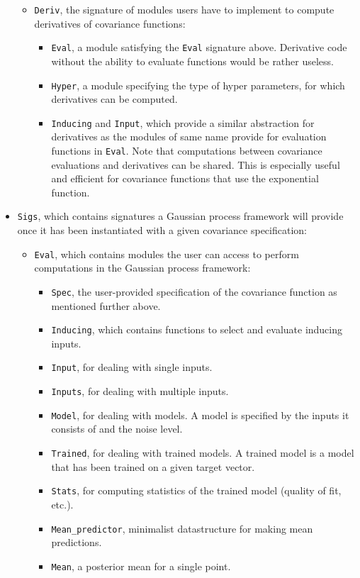 \documentclass[10pt]{report}
\begin{document}
\begin{itemize}
\begin{itemize}
\item \verb=Deriv=, the signature of modules users have to implement to compute
derivatives of covariance functions:
\begin{itemize}
\item \verb=Eval=, a module satisfying the \verb=Eval= signature above.
Derivative code without the ability to evaluate functions would be rather
useless.
\item \verb=Hyper=, a module specifying the type of hyper parameters, for which
derivatives can be computed.
\item \verb=Inducing= and \verb=Input=, which provide a similar abstraction for
derivatives as the modules of same name provide for evaluation functions in
\verb=Eval=.  Note that computations between covariance evaluations and
derivatives can be shared.  This is especially useful and efficient for
covariance functions that use the exponential function.
\end{itemize}
\end{itemize}
\item \verb=Sigs=, which contains signatures a Gaussian process framework will
provide once it has been instantiated with a given covariance specification:
\begin{itemize}
\item \verb=Eval=, which contains modules the user can access to perform
computations in the Gaussian process framework:
\begin{itemize}
\item \verb=Spec=, the user-provided specification of the covariance function as
mentioned further above.
\item \verb=Inducing=, which contains functions to select and evaluate inducing
inputs.
\item \verb=Input=, for dealing with single inputs.
\item \verb=Inputs=, for dealing with multiple inputs.
\item \verb=Model=, for dealing with models.  A model is specified by the inputs
it consists of and the noise level.
\item \verb=Trained=, for dealing with trained models.  A trained model is a
model that has been trained on a given target vector.
\item \verb=Stats=, for computing statistics of the trained model (quality of
fit, etc.).
\item \verb=Mean_predictor=, minimalist datastructure for making mean
predictions.
\item \verb=Mean=, a posterior mean for a single point.

\end{itemize}
\end{itemize}
\end{itemize}
\end{document}
